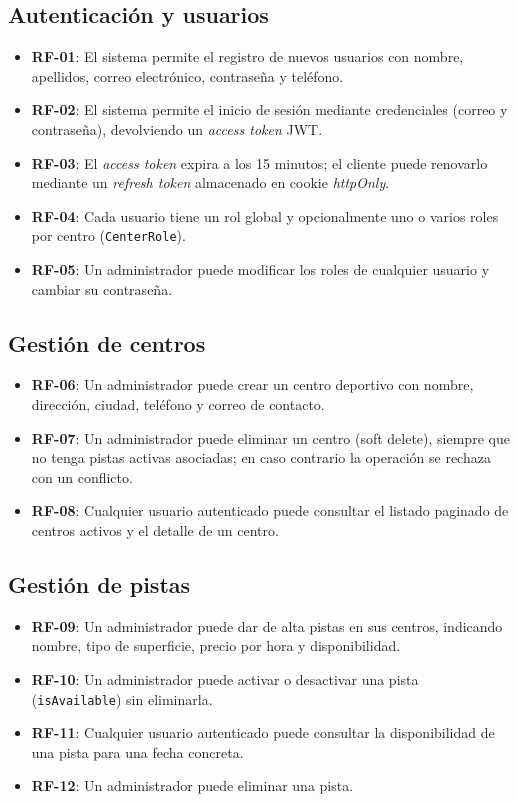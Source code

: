 \subsection{Autenticación y usuarios}

\begin{itemize}
  \item \textbf{RF-01}: El sistema permite el registro de nuevos usuarios con
    nombre, apellidos, correo electrónico, contraseña y teléfono.
  \item \textbf{RF-02}: El sistema permite el inicio de sesión mediante
    credenciales (correo y contraseña), devolviendo un \textit{access token} JWT.
  \item \textbf{RF-03}: El \textit{access token} expira a los 15 minutos; el
    cliente puede renovarlo mediante un \textit{refresh token} almacenado en
    cookie \textit{httpOnly}.
  \item \textbf{RF-04}: Cada usuario tiene un rol global y opcionalmente uno
    o varios roles por centro (\texttt{CenterRole}).
  \item \textbf{RF-05}: Un administrador puede modificar los roles de cualquier
    usuario y cambiar su contraseña.
\end{itemize}

\subsection{Gestión de centros}

\begin{itemize}
  \item \textbf{RF-06}: Un administrador puede crear un centro deportivo con
    nombre, dirección, ciudad, teléfono y correo de contacto.
  \item \textbf{RF-07}: Un administrador puede eliminar un centro (soft delete),
    siempre que no tenga pistas activas asociadas; en caso contrario la
    operación se rechaza con un conflicto.
  \item \textbf{RF-08}: Cualquier usuario autenticado puede consultar el listado
    paginado de centros activos y el detalle de un centro.
\end{itemize}

\subsection{Gestión de pistas}

\begin{itemize}
  \item \textbf{RF-09}: Un administrador puede dar de alta pistas en sus centros,
    indicando nombre, tipo de superficie, precio por hora y disponibilidad.
  \item \textbf{RF-10}: Un administrador puede activar o desactivar una pista
    (\texttt{isAvailable}) sin eliminarla.
  \item \textbf{RF-11}: Cualquier usuario autenticado puede consultar la
    disponibilidad de una pista para una fecha concreta.
  \item \textbf{RF-12}: Un administrador puede eliminar una pista.
\end{itemize}

